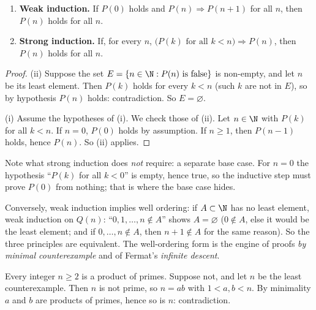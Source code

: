 \begin{proposition}\label{prop:induction}
\begin{enumerate}[label=(\roman*)]
\item \textbf{Weak induction.} If $P(0)$ holds and $P(n)\Rightarrow P(n+1)$ for all $n$, then $P(n)$ holds for all $n$.
\item \textbf{Strong induction.} If, for every $n$, $\bigl(P(k)\text{ for all }k<n\bigr)\Rightarrow P(n)$, then $P(n)$ holds for all $n$.
\end{enumerate}
\end{proposition}
\begin{proof}
(ii) Suppose the set $E=\{n\in\N:P(n)\text{ is false}\}$ is non-empty, and let $n$ be its least element. Then $P(k)$ holds for every $k<n$ (such $k$ are not in $E$), so by hypothesis $P(n)$ holds: contradiction. So $E=\varnothing$.

(i) Assume the hypotheses of (i). We check those of (ii). Let $n\in\N$ with $P(k)$ for all $k<n$. If $n=0$, $P(0)$ holds by assumption. If $n\ge1$, then $P(n-1)$ holds, hence $P(n)$. So (ii) applies.
\end{proof}

Note what strong induction does \emph{not} require: a separate base case. For $n=0$ the hypothesis ``$P(k)$ for all $k<0$'' is empty, hence true, so
the inductive step must prove $P(0)$ from nothing; that is where the base case hides.

Conversely, weak induction implies well ordering: if $A\subset\N$ has no least element, weak induction on $Q(n)$: ``$0,1,\dots,n\notin A$'' shows $A=\varnothing$ ($0\notin A$, else it would be the least element; and if $0,\dots,n\notin A$, then $n+1\notin A$ for the same reason). So the three principles are equivalent. The well-ordering form is the engine of proofs \emph{by minimal counterexample} and of Fermat's \emph{infinite descent}.

\begin{example}
Every integer $n\ge 2$ is a product of primes. Suppose not, and let $n$ be the least counterexample.
Then $n$ is not prime, so $n=ab$ with $1<a,b<n$. By minimality $a$ and $b$ are products of primes, hence
so is $n$: contradiction.
\end{example}

